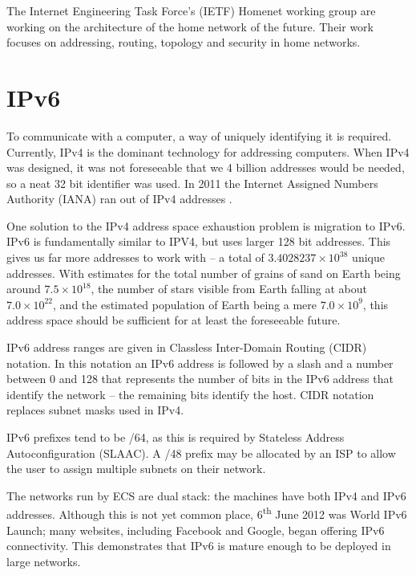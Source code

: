 \documentclass[12pt,a4paper,twoside]{report}
\begin{document}
The Internet Engineering Task Force's (IETF) Homenet working group
\cite{homenet} are working on the architecture of the home network of the
future. Their work focuses on addressing, routing, topology and security
in home networks. 

\section{IPv6}
To communicate with a computer, a way of uniquely identifying it is required.
Currently, IPv4 is the dominant technology for addressing computers. When IPv4
was designed, it was not foreseeable that we 4 billion addresses would be
needed, so a neat 32 bit identifier was used.  In 2011 the Internet Assigned
Numbers Authority (IANA)  ran out of IPv4 addresses \cite{potaroo}. 

One solution to the IPv4 address space exhaustion problem is migration to IPv6.
IPv6 is fundamentally similar to IPV4, but uses larger 128 bit addresses. This
gives us far more addresses to work with -- a total of $3.4028237\times10^{38}$
unique addresses. With estimates for the total number of grains of sand on
Earth being around $7.5\times10^{18}$, the number of stars visible from Earth
falling at about $7.0\times10^{22}$, and the estimated population of Earth
being a mere $7.0\times10^{9}$, this address space should be sufficient for at
least the foreseeable future. 

IPv6 address ranges are given in Classless Inter-Domain Routing (CIDR)
 notation. In this notation
an IPv6 address is followed by a slash and a number between 0 and 128 that
represents the number of bits in the IPv6 address that identify the network --
the remaining bits identify the host. CIDR notation replaces subnet masks used
in IPv4.

IPv6 prefixes tend to be /64, as this is required by Stateless Address
Autoconfiguration (SLAAC). A /48 prefix may be allocated by an ISP to allow the user
to assign multiple subnets on their network.

The networks run by ECS are dual stack: the machines have both IPv4 and IPv6
addresses. Although this is not yet common place, 6\textsuperscript{th} June
2012 was World IPv6 Launch; many websites, including Facebook and Google, began
offering IPv6 connectivity\cite{IPv6Launch}. This demonstrates that IPv6 is
mature enough to be deployed in large networks.
\end{document}
